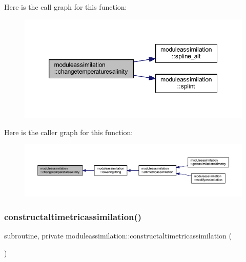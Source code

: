 Here is the call graph for this function\+:\nopagebreak
\begin{figure}[H]
\begin{center}
\leavevmode
\includegraphics[width=350pt]{namespacemoduleassimilation_a689487c17f9fdb64311b351530c9244a_cgraph}
\end{center}
\end{figure}
Here is the caller graph for this function\+:\nopagebreak
\begin{figure}[H]
\begin{center}
\leavevmode
\includegraphics[width=350pt]{namespacemoduleassimilation_a689487c17f9fdb64311b351530c9244a_icgraph}
\end{center}
\end{figure}
\mbox{\label{namespacemoduleassimilation_a26af0cc2dc6eb3e9e9dbefe2fb8c7b48}} 
\subsubsection{\texorpdfstring{constructaltimetricassimilation()}{constructaltimetricassimilation()}}
{\footnotesize\ttfamily subroutine, private moduleassimilation\+::constructaltimetricassimilation (\begin{DoxyParamCaption}{ }\end{DoxyParamCaption})\hspace{0.3cm}{\ttfamily [private]}}

